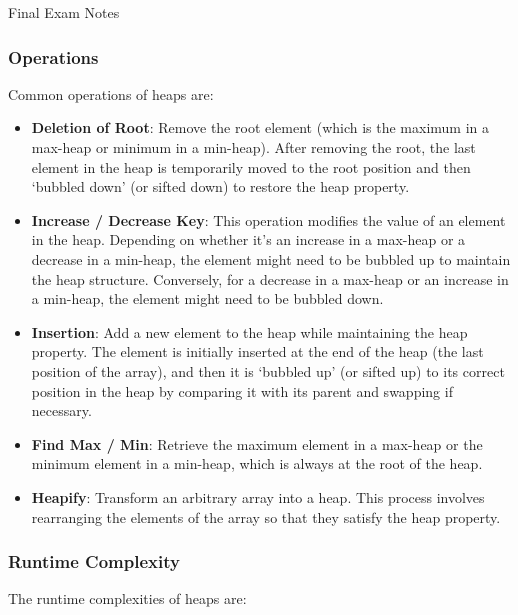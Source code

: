 \begin{examnotes}{Final Exam Notes}
    \subsubsection*{Operations}

    Common operations of heaps are:
    
    \begin{itemize}
        \item  \textbf{Deletion of Root}: Remove the root element (which is the maximum in a max-heap or minimum in a min-heap). After removing the root, the last element in the heap is temporarily 
        moved to the root position and then `bubbled down' (or sifted down) to restore the heap property.
        \item \textbf{Increase / Decrease Key}: This operation modifies the value of an element in the heap. Depending on whether it's an increase in a max-heap or a decrease in a min-heap, the element 
        might need to be bubbled up to maintain the heap structure. Conversely, for a decrease in a max-heap or an increase in a min-heap, the element might need to be bubbled down.
        \item \textbf{Insertion}: Add a new element to the heap while maintaining the heap property. The element is initially inserted at the end of the heap (the last position of the array), and then 
        it is `bubbled up' (or sifted up) to its correct position in the heap by comparing it with its parent and swapping if necessary.
        \item \textbf{Find Max / Min}: Retrieve the maximum element in a max-heap or the minimum element in a min-heap, which is always at the root of the heap.
        \item \textbf{Heapify}: Transform an arbitrary array into a heap. This process involves rearranging the elements of the array so that they satisfy the heap property.
    \end{itemize}

    \subsubsection*{Runtime Complexity}

    The runtime complexities of heaps are:


\end{examnotes}
